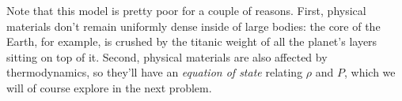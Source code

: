 \documentclass[11pt]{article}
\begin{document}
\begin{enumerate}
\hspace{15pt} Note that this model is pretty poor for a couple of reasons. First, physical materials don't remain uniformly dense inside of large bodies: the core of the Earth, for example, is crushed by the titanic weight of all the planet's layers sitting on top of it. Second, physical materials are also affected by thermodynamics, so they'll have an \textit{equation of state} relating $\rho$ and $P$, which we will of course explore in the next problem.

\end{enumerate}
\end{document}
